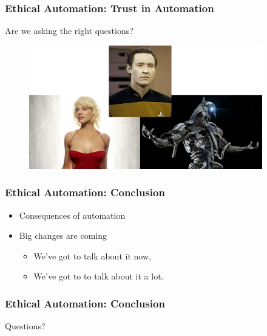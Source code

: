 \begin{frame}
  \frametitle{ Ethical Automation: Trust in Automation}
  {\Large Are we asking the right questions?}
  \begin{figure}[bht]
    \centering
    \includegraphics[width=4.0in]{diagrams/AIs}
  \end{figure}
\end{frame}

\begin{frame}
  \frametitle{ Ethical Automation: Conclusion}
  \begin{itemize}
    \item Consequences of automation
    \item Big changes are coming
      \begin{itemize}
        \item We've got to talk about it now,
        \item We've got to to talk about it a lot.
      \end{itemize}
  \end{itemize}
\end{frame}


\begin{frame}
  \frametitle{ Ethical Automation: Conclusion}
  \Large Questions?
\end{frame}

